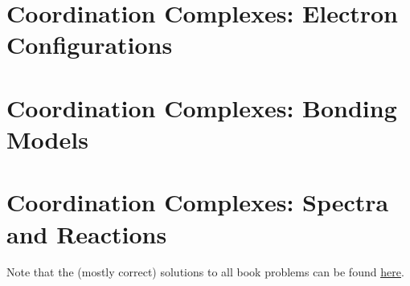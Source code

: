 \documentclass[titlepage]{article}
\numberwithin{figure}{section}
\numberwithin{table}{section}
\begin{document}
\section{Coordination Complexes: Electron Configurations}

\newpage



\section{Coordination Complexes: Bonding Models}

\newpage



\section{Coordination Complexes: Spectra and Reactions}

\newpage



\renewcommand{\leftmark}{References}
\printbibliography[heading=bibintoc]

Note that the (mostly correct) solutions to all book problems can be found \href{https://www.chem.uci.edu/~lawm/107.html?fbclid=IwAR0mQljnCSONs96ZRMeseJbx-0psD2kslMZfl0nDnpq5SmcAnE0isXZU1C8}{\underline{here}}.
\end{document}
